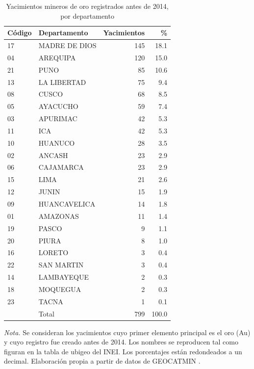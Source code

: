 \documentclass[man,12pt,a4paper,floatsintext,donotrepeattitle]{apa7}
\newcommand{\interlineadosencillo}{\renewcommand{\baselinestretch}{1}\selectfont}
\begin{document}
\begin{table}[htbp]
\caption{Yacimientos mineros de oro registrados antes de 2014, por departamento}
\label{tab:departamentos}
\centering
\interlineadosencillo
\begin{threeparttable}
\begin{tabular}{@{}llrr@{}}
\toprule
Código & Departamento & Yacimientos & \% \\
\midrule
17 & MADRE DE DIOS  & 145 & 18.1 \\
04 & AREQUIPA       & 120 & 15.0 \\
21 & PUNO           &  85 & 10.6 \\
13 & LA LIBERTAD    &  75 &  9.4 \\
08 & CUSCO          &  68 &  8.5 \\
05 & AYACUCHO       &  59 &  7.4 \\
03 & APURIMAC       &  42 &  5.3 \\
11 & ICA            &  42 &  5.3 \\
10 & HUANUCO        &  28 &  3.5 \\
02 & ANCASH         &  23 &  2.9 \\
06 & CAJAMARCA      &  23 &  2.9 \\
15 & LIMA           &  21 &  2.6 \\
12 & JUNIN          &  15 &  1.9 \\
09 & HUANCAVELICA   &  14 &  1.8 \\
01 & AMAZONAS       &  11 &  1.4 \\
19 & PASCO          &   9 &  1.1 \\
20 & PIURA          &   8 &  1.0 \\
16 & LORETO         &   3 &  0.4 \\
22 & SAN MARTIN     &   3 &  0.4 \\
14 & LAMBAYEQUE     &   2 &  0.3 \\
18 & MOQUEGUA       &   2 &  0.3 \\
23 & TACNA          &   1 &  0.1 \\
\midrule
   & Total          & 799 & 100.0 \\
\bottomrule
\end{tabular}
\vspace{6pt}
\begin{tablenotes}[flushleft]
\small
\item \textit{Nota.} Se consideran los yacimientos cuyo primer elemento
principal es el oro (Au) y cuyo registro fue creado antes de 2014. Los nombres se reproducen tal como figuran en la
tabla de ubigeo del INEI. Los porcentajes están redondeados a un decimal.
Elaboración propia a partir de datos de GEOCATMIN \parencite{ingemmet2026}.
\end{tablenotes}
\end{threeparttable}
\end{table}
\end{document}
